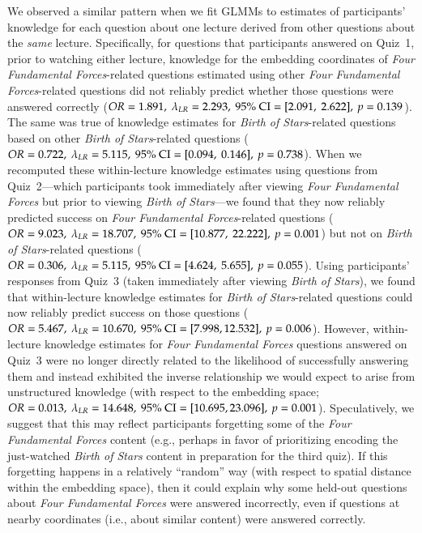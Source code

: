 \documentclass[10pt]{article}
\begin{document}
We observed a similar pattern when we fit GLMMs to estimates of participants' knowledge for each question about one lecture derived from other questions about the \textit{same} lecture. 
Specifically, for questions that participants answered on Quiz~1, prior to watching either lecture, knowledge for the embedding coordinates of \textit{Four Fundamental Forces}-related questions estimated using other \textit{Four Fundamental Forces}-related questions did not reliably predict whether those questions were answered correctly ($OR = 1.891,\ \lambda_{LR} = 2.293,\ 95\%\ \textnormal{CI} = [2.091,\ 2.622],\ p = 0.139$). 
The same was true of knowledge estimates for \textit{Birth of Stars}-related questions based on other \textit{Birth of Stars}-related questions ($OR = 0.722,\ \lambda_{LR} = 5.115,\ 95\%\ \textnormal{CI} = [0.094,\ 0.146],\ p = 0.738$). 
When we recomputed these within-lecture knowledge estimates using questions from Quiz~2---which participants took immediately after viewing \textit{Four Fundamental Forces} but prior to viewing \textit{Birth of Stars}---we found that they now reliably predicted success on \textit{Four Fundamental Forces}-related questions ($OR = 9.023,\ \lambda_{LR} = 18.707,\ 95\%\ \textnormal{CI} = [10.877,\ 22.222],\ p = 0.001$) but not on \textit{Birth of Stars}-related questions ($OR = 0.306,\ \lambda_{LR} = 5.115,\ 95\%\ \textnormal{CI} = [4.624,\ 5.655],\ p = 0.055$).
Using participants' responses from Quiz~3 (taken immediately after viewing \textit{Birth of Stars}), we found that within-lecture knowledge estimates for \textit{Birth of Stars}-related questions could now reliably predict success on those questions ($OR = 5.467,\ \lambda_{LR} = 10.670,\ 95\%\ \textnormal{CI} = [7.998, 12.532],\ p = 0.006$). 
However, within-lecture knowledge estimates for \textit{Four Fundamental Forces} questions answered on Quiz~3 were no longer directly related to the likelihood of successfully answering them and instead exhibited the inverse relationship we would expect to arise from unstructured knowledge (with respect to the embedding space; $OR = 0.013,\ \lambda_{LR} = 14.648,\ 95\%\ \textnormal{CI} = [10.695, 23.096],\ p = 0.001$).
Speculatively, we suggest that this may reflect participants forgetting some of the \textit{Four Fundamental Forces} content (e.g., perhaps in favor of prioritizing encoding the just-watched \textit{Birth of Stars} content in preparation for the third quiz). 
If this forgetting happens in a relatively ``random'' way (with respect to spatial distance within the embedding space), then it could explain why some held-out questions about \textit{Four Fundamental Forces} were answered incorrectly, even if questions at nearby coordinates (i.e., about similar content) were answered correctly.
\end{document}
